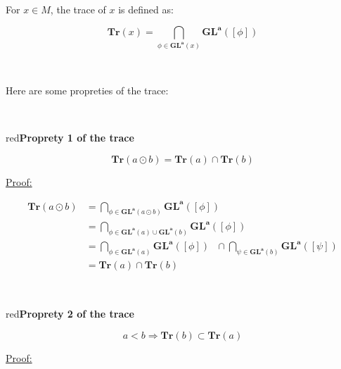 \documentclass[a4paper, 11pt]{article}
\begin{document}
\

\begin{tcolorbox}

For $x \in M$, the trace of $x$ is defined as:

\begin{equation}
    \textbf{Tr}(x) = \bigcap_{\phi \in \boldsymbol{GL}^{\boldsymbol{a}}(x)} \boldsymbol{GL}^{\boldsymbol{a}}([\phi])
\end{equation}
\end{tcolorbox}

\

Here are some propreties of the trace:

\

\begin{mybox}{red}{\textbf{Proprety 1 of the trace}}

\begin{equation}
    \textbf{Tr}(a \odot b) = \textbf{Tr}(a) \cap \textbf{Tr}(b)
\end{equation}

\end{mybox}

\noindent
\underline{Proof:}

\begin{align*}
    \textbf{Tr}(a \odot b) &= \bigcap_{\phi \in \boldsymbol{GL}^{\boldsymbol{a}}(a \odot b)} \boldsymbol{GL}^{\boldsymbol{a}}([\phi]) \\
    &= \bigcap_{\phi \in \boldsymbol{GL}^{\boldsymbol{a}}(a) \cup \boldsymbol{GL}^{\boldsymbol{a}}(b)} \boldsymbol{GL}^{\boldsymbol{a}}([\phi]) \\
    &= \bigcap_{\phi \in \boldsymbol{GL}^{\boldsymbol{a}}(a)}  \boldsymbol{GL}^{\boldsymbol{a}}([\phi])\text{    } \cap \bigcap_{\psi \in \boldsymbol{GL}^{\boldsymbol{a}}(b)} \boldsymbol{GL}^{\boldsymbol{a}}([\psi]) \\
    &= \textbf{Tr}(a) \cap \textbf{Tr}(b)
\end{align*}

\

\begin{mybox}{red}{\textbf{Proprety 2 of the trace}}

\begin{equation}
    a < b \Rightarrow \textbf{Tr}(b) \subset \textbf{Tr}(a)
\end{equation}

\end{mybox}

\noindent
\underline{Proof:}
\end{document}
